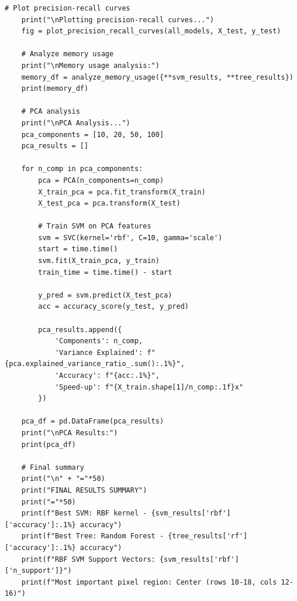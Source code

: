 \documentclass[12pt,a4paper]{article}
\theoremstyle{definition}
\begin{document}
\begin{lstlisting}[caption={MNIST Classification Implementation}]
    # Plot precision-recall curves
    print("\nPlotting precision-recall curves...")
    fig = plot_precision_recall_curves(all_models, X_test, y_test)
    
    # Analyze memory usage
    print("\nMemory usage analysis:")
    memory_df = analyze_memory_usage({**svm_results, **tree_results})
    print(memory_df)
    
    # PCA analysis
    print("\nPCA Analysis...")
    pca_components = [10, 20, 50, 100]
    pca_results = []
    
    for n_comp in pca_components:
        pca = PCA(n_components=n_comp)
        X_train_pca = pca.fit_transform(X_train)
        X_test_pca = pca.transform(X_test)
        
        # Train SVM on PCA features
        svm = SVC(kernel='rbf', C=10, gamma='scale')
        start = time.time()
        svm.fit(X_train_pca, y_train)
        train_time = time.time() - start
        
        y_pred = svm.predict(X_test_pca)
        acc = accuracy_score(y_test, y_pred)
        
        pca_results.append({
            'Components': n_comp,
            'Variance Explained': f"{pca.explained_variance_ratio_.sum():.1%}",
            'Accuracy': f"{acc:.1%}",
            'Speed-up': f"{X_train.shape[1]/n_comp:.1f}x"
        })
    
    pca_df = pd.DataFrame(pca_results)
    print("\nPCA Results:")
    print(pca_df)
    
    # Final summary
    print("\n" + "="*50)
    print("FINAL RESULTS SUMMARY")
    print("="*50)
    print(f"Best SVM: RBF kernel - {svm_results['rbf']['accuracy']:.1%} accuracy")
    print(f"Best Tree: Random Forest - {tree_results['rf']['accuracy']:.1%} accuracy")
    print(f"RBF SVM Support Vectors: {svm_results['rbf']['n_support']}")
    print(f"Most important pixel region: Center (rows 10-18, cols 12-16)")
\end{lstlisting}
\end{document}
